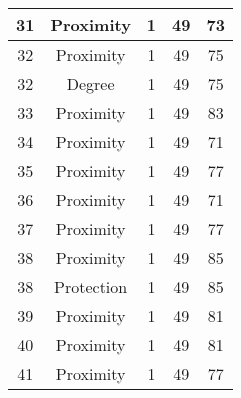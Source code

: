 \documentclass[results.tex]{subfiles}
\begin{document}
\begin{center}
\begin{tabular}{| c || c | c | c | c |}
            \hline
            31                      & Proximity                    & 1                      & 49                      & 73                   \\
            \hline
            32                      & Proximity                    & 1                      & 49                      & 75                   \\
            \hline
            32                      & Degree                       & 1                      & 49                      & 75                   \\
            \hline
            33                      & Proximity                    & 1                      & 49                      & 83                   \\
            \hline
            34                      & Proximity                    & 1                      & 49                      & 71                   \\
            \hline
            35                      & Proximity                    & 1                      & 49                      & 77                   \\
            \hline
            36                      & Proximity                    & 1                      & 49                      & 71                   \\
            \hline
            37                      & Proximity                    & 1                      & 49                      & 77                   \\
            \hline
            38                      & Proximity                    & 1                      & 49                      & 85                   \\
            \hline
            38                      & Protection                   & 1                      & 49                      & 85                   \\
            \hline
            39                      & Proximity                    & 1                      & 49                      & 81                   \\
            \hline
            40                      & Proximity                    & 1                      & 49                      & 81                   \\
            \hline
            41                      & Proximity                    & 1                      & 49                      & 77                   \\

\end{tabular}
\end{center}
\end{document}
